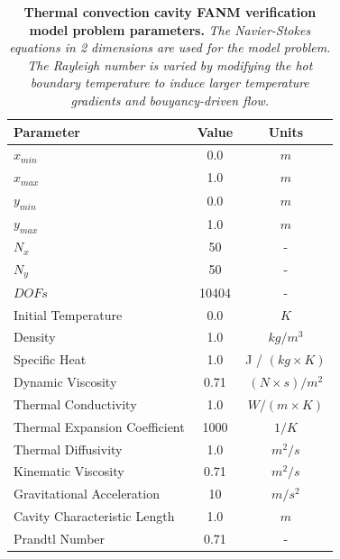 \begin{table}[h!]
  \begin{center}
    \begin{tabular}{lcc}\hline\hline
      \multicolumn{1}{l}{Parameter}& 
      \multicolumn{1}{c}{Value}&
      \multicolumn{1}{c}{Units}\\\hline
      $x_{min}$ & 0.0 & $m$ \\
      $x_{max}$ & 1.0 & $m$ \\
      $y_{min}$ & 0.0 & $m$ \\
      $y_{max}$ & 1.0 & $m$ \\
      $N_x$ & 50 & - \\
      $N_y$ & 50 & - \\
      $DOFs$ & 10404 & - \\
      Initial Temperature & 0.0 & $K$ \\
      Density & 1.0 & $kg / m^3$ \\
      Specific Heat & 1.0 & J / $(kg \times K)$ \\
      Dynamic Viscosity & 0.71 & $(N \times s) / m^2$ \\
      Thermal Conductivity & 1.0 & $W / (m \times K)$ \\
      Thermal Expansion Coefficient & 1000 & $1 / K$ \\
      Thermal Diffusivity & 1.0 & $m^2 / s$ \\
      Kinematic Viscosity & 0.71 & $m^2 / s$ \\
      Gravitational Acceleration & 10 & $m / s^2$ \\
      Cavity Characteristic Length & 1.0 & $m$ \\
      Prandtl Number & 0.71 & - \\
      \hline\hline
    \end{tabular}
  \end{center}
  \caption{\textbf{Thermal convection cavity FANM verification model
      problem parameters.}  \textit{The Navier-Stokes equations in 2
      dimensions are used for the model problem. The Rayleigh number
      is varied by modifying the hot boundary temperature to induce
      larger temperature gradients and bouyancy-driven flow.}}
  \label{tab:thermal_convection_parameters}
\end{table}

